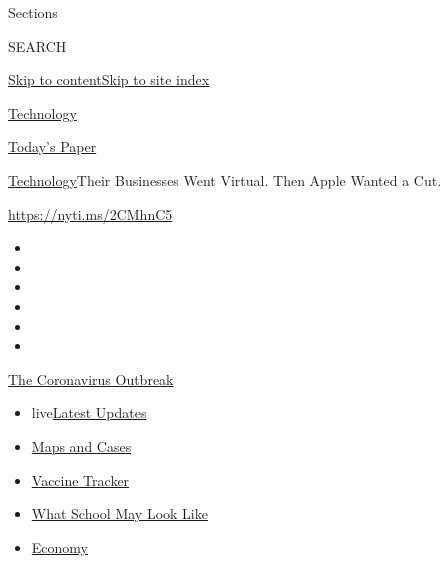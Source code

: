 Sections

SEARCH

\protect\hyperlink{site-content}{Skip to
content}\protect\hyperlink{site-index}{Skip to site index}

\href{https://www.nytimes.com/section/technology}{Technology}

\href{https://myaccount.nytimes.com/auth/login?response_type=cookie\&client_id=vi}{}

\href{https://www.nytimes.com/section/todayspaper}{Today's Paper}

\href{/section/technology}{Technology}\textbar{}Their Businesses Went
Virtual. Then Apple Wanted a Cut.

\url{https://nyti.ms/2CMhnC5}

\begin{itemize}
\item
\item
\item
\item
\item
\item
\end{itemize}

\href{https://www.nytimes.com/news-event/coronavirus?action=click\&pgtype=Article\&state=default\&region=TOP_BANNER\&context=storylines_menu}{The
Coronavirus Outbreak}

\begin{itemize}
\tightlist
\item
  live\href{https://www.nytimes.com/2020/08/01/world/coronavirus-covid-19.html?action=click\&pgtype=Article\&state=default\&region=TOP_BANNER\&context=storylines_menu}{Latest
  Updates}
\item
  \href{https://www.nytimes.com/interactive/2020/us/coronavirus-us-cases.html?action=click\&pgtype=Article\&state=default\&region=TOP_BANNER\&context=storylines_menu}{Maps
  and Cases}
\item
  \href{https://www.nytimes.com/interactive/2020/science/coronavirus-vaccine-tracker.html?action=click\&pgtype=Article\&state=default\&region=TOP_BANNER\&context=storylines_menu}{Vaccine
  Tracker}
\item
  \href{https://www.nytimes.com/interactive/2020/07/29/us/schools-reopening-coronavirus.html?action=click\&pgtype=Article\&state=default\&region=TOP_BANNER\&context=storylines_menu}{What
  School May Look Like}
\item
  \href{https://www.nytimes.com/live/2020/07/31/business/stock-market-today-coronavirus?action=click\&pgtype=Article\&state=default\&region=TOP_BANNER\&context=storylines_menu}{Economy}
\end{itemize}

